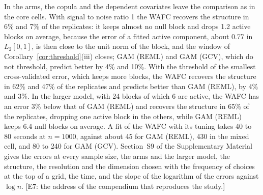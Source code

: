\documentclass[12pt]{article} %
\theoremstyle{definition}
\theoremstyle{plain}
\begin{document}
{In the arms, the copula and the dependent covariates leave the comparison as
in the core cells. With signal to noise ratio 1 the WAFC recovers the
structure in 6\% and 7\% of the replicates: it keeps almost no null block and
drops 1.2 active blocks on average, because the error of a fitted active
component, about 0.77 in $L_2[0,1]$, is then close to the unit norm of the
block, and the window of Corollary~\ref{cor:threshold}(iii) closes; GAM
(REML) and GAM (GCV), which do not threshold, predict better by 4\% and 10\%.
With the threshold of the smallest cross-validated error, which keeps more
blocks, the WAFC recovers the structure in 62\% and 47\% of the replicates
and predicts better than GAM (REML), by 4\% and 3\%.
In the larger model, with 24 blocks of which 6 are active, the WAFC has an
error 3\% below that of GAM (REML) and recovers the structure in 65\% of the
replicates, dropping one active block in the others, while GAM (REML) keeps
6.4 null blocks on average. A fit of the WAFC with its tuning takes 40 to 80
seconds at $n = 1000$, against about 45 for GAM (REML), 430 in the mixed
cell, and 80 to 240 for GAM (GCV). Section~S9 of the Supplementary Material
gives the errors at every sample size, the arms and the larger model,
the structure, the resolution and the dimension chosen with the frequency of
choices at the top of a grid, the time, and the slope of the logarithm of the
errors against $\log n$. [E7: the address of the compendium that reproduces
the study.]



}
\end{document}
